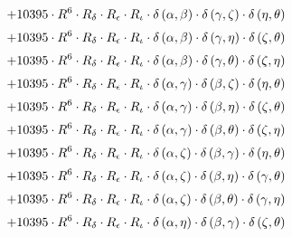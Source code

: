 \begin{subequations}
\begin{gather}
 \\[0.2em] \notag 		 + 10395 \cdot R^{6} \cdot R_{\delta{}} \cdot R_{\epsilon{}} \cdot R_{\iota{}} \cdot \delta{}\left(\alpha{}, \beta{}\right) \cdot \delta{}\left(\gamma{}, \zeta{}\right) \cdot \delta{}\left(\eta{}, \theta{}\right) 
 \\[0.2em] \notag 		 + 10395 \cdot R^{6} \cdot R_{\delta{}} \cdot R_{\epsilon{}} \cdot R_{\iota{}} \cdot \delta{}\left(\alpha{}, \beta{}\right) \cdot \delta{}\left(\gamma{}, \eta{}\right) \cdot \delta{}\left(\zeta{}, \theta{}\right) 
 \\[0.2em] \notag 		 + 10395 \cdot R^{6} \cdot R_{\delta{}} \cdot R_{\epsilon{}} \cdot R_{\iota{}} \cdot \delta{}\left(\alpha{}, \beta{}\right) \cdot \delta{}\left(\gamma{}, \theta{}\right) \cdot \delta{}\left(\zeta{}, \eta{}\right) 
 \\[0.2em] \notag 		 + 10395 \cdot R^{6} \cdot R_{\delta{}} \cdot R_{\epsilon{}} \cdot R_{\iota{}} \cdot \delta{}\left(\alpha{}, \gamma{}\right) \cdot \delta{}\left(\beta{}, \zeta{}\right) \cdot \delta{}\left(\eta{}, \theta{}\right) 
 \\[0.2em] \notag 		 + 10395 \cdot R^{6} \cdot R_{\delta{}} \cdot R_{\epsilon{}} \cdot R_{\iota{}} \cdot \delta{}\left(\alpha{}, \gamma{}\right) \cdot \delta{}\left(\beta{}, \eta{}\right) \cdot \delta{}\left(\zeta{}, \theta{}\right) 
 \\[0.2em] \notag 		 + 10395 \cdot R^{6} \cdot R_{\delta{}} \cdot R_{\epsilon{}} \cdot R_{\iota{}} \cdot \delta{}\left(\alpha{}, \gamma{}\right) \cdot \delta{}\left(\beta{}, \theta{}\right) \cdot \delta{}\left(\zeta{}, \eta{}\right) 
 \\[0.2em] \notag 		 + 10395 \cdot R^{6} \cdot R_{\delta{}} \cdot R_{\epsilon{}} \cdot R_{\iota{}} \cdot \delta{}\left(\alpha{}, \zeta{}\right) \cdot \delta{}\left(\beta{}, \gamma{}\right) \cdot \delta{}\left(\eta{}, \theta{}\right) 
 \\[0.2em] \notag 		 + 10395 \cdot R^{6} \cdot R_{\delta{}} \cdot R_{\epsilon{}} \cdot R_{\iota{}} \cdot \delta{}\left(\alpha{}, \zeta{}\right) \cdot \delta{}\left(\beta{}, \eta{}\right) \cdot \delta{}\left(\gamma{}, \theta{}\right) 
 \\[0.2em] \notag 		 + 10395 \cdot R^{6} \cdot R_{\delta{}} \cdot R_{\epsilon{}} \cdot R_{\iota{}} \cdot \delta{}\left(\alpha{}, \zeta{}\right) \cdot \delta{}\left(\beta{}, \theta{}\right) \cdot \delta{}\left(\gamma{}, \eta{}\right) 
 \\[0.2em] \notag 		 + 10395 \cdot R^{6} \cdot R_{\delta{}} \cdot R_{\epsilon{}} \cdot R_{\iota{}} \cdot \delta{}\left(\alpha{}, \eta{}\right) \cdot \delta{}\left(\beta{}, \gamma{}\right) \cdot \delta{}\left(\zeta{}, \theta{}\right) 

\end{gather}
\end{subequations}
